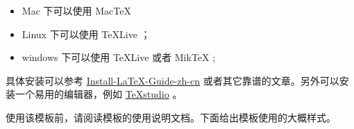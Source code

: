 \documentclass{cumcmthesis}
\begin{document}
\begin{itemize}
    \item Mac 下可以使用 Mac\TeX{}
    \item Linux 下可以使用 \TeX{}Live ；
    \item windows 下可以使用 \TeX{}Live 或者 Mik\TeX{} ;
\end{itemize}

具体安装可以参考 \href{https://github.com/OsbertWang/install-latex-guide-zh-cn/releases/}{Install-LaTeX-Guide-zh-cn} 或者其它靠谱的文章。另外可以安装一个易用的编辑器，例如 \href{https://mirrors.tuna.tsinghua.edu.cn/github-release/texstudio-org/texstudio/LatestRelease/}{\TeX{}studio} 。

使用该模板前，请阅读模板的使用说明文档。下面给出模板使用的大概样式。

\end{document}
